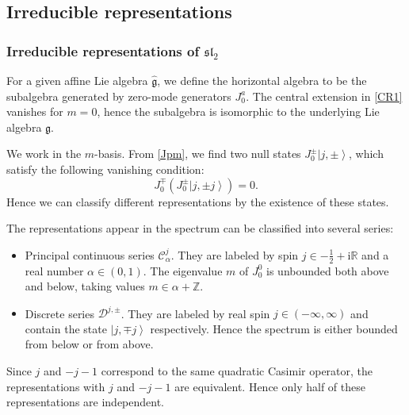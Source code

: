\documentclass[10pt,a4paper]{article}
\numberwithin{equation}{section}
\newcommand{\ket}[1]{\left| #1 \right\rangle}
\begin{document}
\subsection{Irreducible representations}
\subsubsection*{Irreducible representations of \texorpdfstring{$\mathfrak{sl}_{2}$}{Lg}}
For a given affine Lie algebra $\widehat{\mathfrak{g}}$, we define the horizontal algebra to be the subalgebra generated by zero-mode 
generators $J^{a}_{0}$. The central extension in \eqref{CR1} vanishes for $m = 0$, hence the subalgebra is isomorphic to the underlying 
Lie algebra $\mathfrak{g}$.

We work in the $m$-basis. From \eqref{Jpm}, we find two null states $J^{\pm}_{0}\ket{j,\pm}$, which satisfy the following vanishing 
condition:
\begin{equation}
    J^{\mp}_{0}\left(J^{\pm}_{0} \ket{j,\pm j}\right) = 0.
\end{equation}
Hence we can classify different representations by the existence of these states.

The representations appear in the spectrum can be classified into several series:
\begin{itemize}
    \item Principal continuous series $\mathcal{C}^{j}_{\alpha}$. They are labeled by spin $j \in -\frac{1}{2} + \mathrm{i} \mathbb{R}$ and 
    a real number $\alpha \in \left(0,1\right)$. The eigenvalue $m$ of $J^{0}_{0}$ is unbounded both above and below, taking values $m \in \alpha + \mathbb{Z}$.
    \item Discrete series $\mathcal{D}^{j,\pm}$. They are labeled by real spin $j \in (-\infty,\infty)$ and contain the state 
    $\ket{j,\mp j}$ respectively. Hence the spectrum is either bounded from below or from above.
\end{itemize}
Since $j$ and $-j-1$ correspond to the same quadratic Casimir operator, the representations with $j$ and $-j-1$ are equivalent. Hence 
only half of these representations are independent. 
\end{document}
